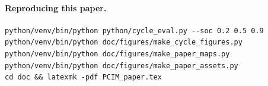 \paragraph{Reproducing this paper.}
\begin{lstlisting}[numbers=none, language={}]
python/venv/bin/python python/cycle_eval.py --soc 0.2 0.5 0.9
python/venv/bin/python doc/figures/make_cycle_figures.py
python/venv/bin/python doc/figures/make_paper_maps.py
python/venv/bin/python doc/figures/make_paper_assets.py
cd doc && latexmk -pdf PCIM_paper.tex
\end{lstlisting}
